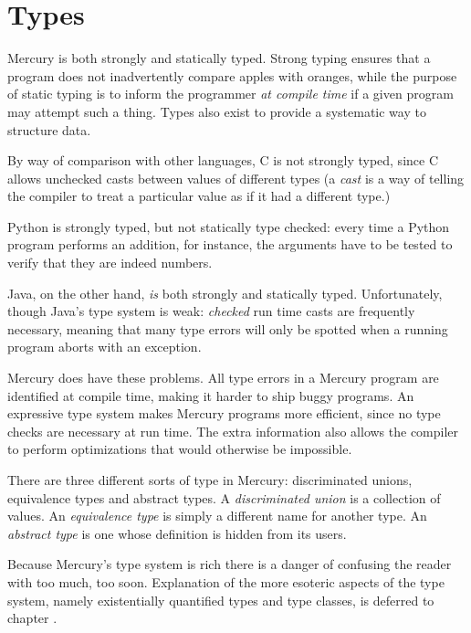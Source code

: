 
\chapter{Types}

Mercury is both strongly and statically typed.  Strong typing ensures
that a program does not inadvertently compare apples with oranges, while
the purpose of static typing is to inform the programmer \emph{at
compile time} if a given program may attempt such a thing.  Types also
exist to provide a systematic way to structure data.


By way of comparison with other languages, C is not
strongly typed, since C allows unchecked casts between values of
different types (a \emph{cast} is a way of telling the compiler to
treat a particular value as if it had a different type.)

Python is strongly typed, but not statically type checked: every time a
Python program performs an addition, for instance, the arguments have to
be tested to verify that they are indeed numbers.

Java, on the other hand, \emph{is} both strongly and statically typed.
Unfortunately, though Java's type system is weak: \emph{checked} run time
casts are frequently necessary, meaning that many type errors will only
be spotted when a running program aborts with an exception.

Mercury does have these problems.  All type errors in
a Mercury program are identified at compile time, making it harder to
ship buggy programs.  An expressive type system makes Mercury programs more
efficient, since no type checks are necessary at run time.  The extra
information also allows the compiler to perform optimizations that would
otherwise be impossible.

There are three different sorts of type in Mercury: discriminated
unions, equivalence types and abstract types.  A \emph{discriminated
union} is a collection of values.  An
\emph{equivalence type} is simply a different name for another type.  An
\emph{abstract type} is one whose definition is hidden from its users.

Because Mercury's type system is rich there is a danger of confusing the
reader with too much, too soon.  Explanation of the more esoteric aspects of
the type system, namely existentially quantified types and type classes, is
deferred to chapter \XXX{}.

